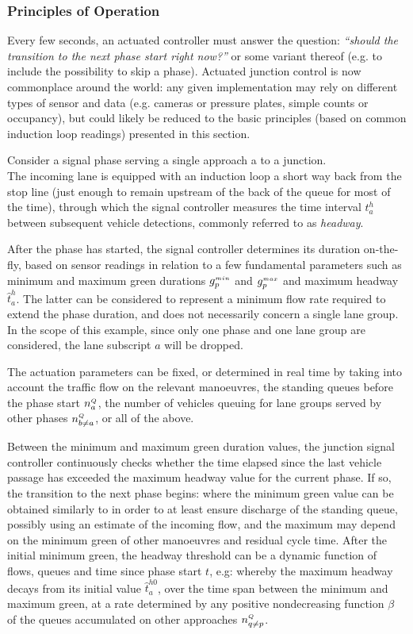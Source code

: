 \subsubsection*{Principles of Operation}
Every few seconds, an actuated controller must answer the question: \textit{“should the
transition to the next phase start right now?”} or some variant thereof (e.g. to include the
possibility to skip a phase). Actuated junction control is now commonplace around the world:
any given implementation may rely on different types of sensor and data (e.g. cameras or
pressure plates, simple counts or occupancy), but could likely be reduced to the basic
principles (based on common induction loop readings) presented in this section.

Consider a signal phase serving a single approach a to a junction.\\
The incoming lane is equipped with an induction loop a short way back from the stop line
(just enough to remain upstream of the back of the queue for most of the time), through which
the signal controller measures the time interval $t_a^h$ between subsequent vehicle detections,
commonly referred to as \emph{headway}.

After the phase has started, the signal controller determines its duration on-the-fly, based
on sensor readings in relation to a few fundamental parameters such as minimum and
maximum green durations $g_{p}^{\scriptscriptstyle{min}}$ and $g_{p}^{\scriptscriptstyle{max}}$ and maximum headway $\hat{t}_a^h$. The latter can be considered to represent a minimum flow rate required to extend the phase duration, and does not necessarily concern a single lane group.
In the scope of this example, since only one phase and one lane group are considered, the lane subscript $a$ will be dropped.

The actuation parameters can be fixed, or determined in real time by taking into account the traffic flow on the relevant manoeuvres, the standing queues before the phase start $n_{a}^{\scriptscriptstyle{Q}}$, the number of vehicles queuing for lane groups served by other phases $n_{b \neq a}^{\scriptscriptstyle{Q}}$, or all of the above.

Between the minimum and maximum green duration values, the junction signal controller
continuously checks whether the time elapsed since the last vehicle passage has exceeded the
maximum headway value for the current phase. If so, the transition to the next phase begins:
where the minimum green value can be obtained similarly to  in order to at least ensure discharge of the standing queue, possibly using an estimate of the incoming flow, and the
maximum may depend on the minimum green of other manoeuvres and residual cycle time.
After the initial minimum green, the headway threshold can be a dynamic function of flows,
queues and time since phase start $t$, e.g:
whereby the maximum headway decays from its initial value $\hat{t}_a^{h0}$, over the time span between the minimum and maximum green, at a rate determined by any positive nondecreasing
function $\beta$ of the queues accumulated on other approaches $n_{q \neq p}^{\scriptscriptstyle{Q}}$.

